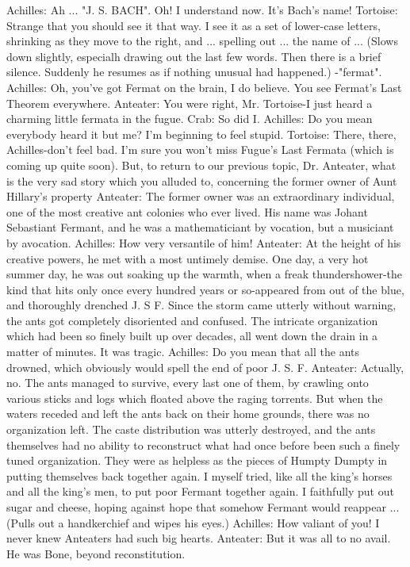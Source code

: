 Achilles: Ah ... "J. S. BACH". Oh! I understand now. It's Bach's name!
Tortoise: Strange that you should see it that way. I see it as a set of lower-case letters,
    shrinking as they move to the right, and ... spelling out ... the name of ... (Slows down
    slightly, especialh drawing out the last few words. Then there is a brief silence.
    Suddenly he resumes as if nothing unusual had happened.) -"fermat".
Achilles: Oh, you've got Fermat on the brain, I do believe. You see Fermat's Last
    Theorem everywhere.
Anteater: You were right, Mr. Tortoise-I just heard a charming little fermata in the fugue.
Crab: So did I.
Achilles: Do you mean everybody heard it but me? I'm beginning to feel stupid.
Tortoise: There, there, Achilles-don't feel bad. I'm sure you won't miss Fugue's Last
    Fermata (which is coming up quite soon). But, to return to our previous topic, Dr.
    Anteater, what is the very sad story which you alluded to, concerning the former
    owner of Aunt Hillary's property
Anteater: The former owner was an extraordinary individual, one of the most creative ant
    colonies who ever lived. His name was Johant Sebastiant Fermant, and he was a
    mathematiciant by vocation, but a musiciant by avocation.
Achilles: How very versantile of him!
Anteater: At the height of his creative powers, he met with a most untimely demise. One
    day, a very hot summer day, he was out soaking up the warmth, when a freak
    thundershower-the kind that hits only once every hundred years or so-appeared from
    out of the blue, and thoroughly drenched J. S F. Since the storm came utterly without
    warning, the ants got completely disoriented and confused. The intricate organization
    which had been so finely built up over decades, all went down the drain in a matter of
    minutes. It was tragic.
Achilles: Do you mean that all the ants drowned, which obviously would spell the end of
    poor J. S. F.
Anteater: Actually, no. The ants managed to survive, every last one of them, by crawling
    onto various sticks and logs which floated above the raging torrents. But when the
    waters receded and left the ants back on their home grounds, there was no
    organization left. The caste distribution was utterly destroyed, and the ants
    themselves had no ability to reconstruct what had once before been such a finely
    tuned organization. They were as helpless as the pieces of Humpty Dumpty in putting
    themselves back together again. I myself tried, like all the king's horses and all the
    king's men, to put poor Fermant together again. I faithfully put out sugar and cheese,
    hoping against hope that somehow Fermant would reappear ... (Pulls out a
    handkerchief and wipes his eyes.)
Achilles: How valiant of you! I never knew Anteaters had such big hearts.
Anteater: But it was all to no avail. He was Bone, beyond reconstitution.





